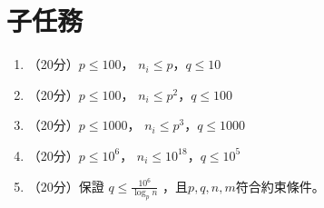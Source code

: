 \documentclass[18pt]{article}
\begin{document}
    \section*{子任務}
    \begin{enumerate}
        \item （20分）$p \le 100$， $n_i \le p$，$q \le 10$
        \item （20分）$p \le 100$， $n_i \le p^2$，$q \le 100$
        \item （20分）$p \le 1000$， $n_i \le p^3$，$q \le 1000$
        \item （20分）$p \le 10^6$， $n_i \le 10^{18}$，$q \le 10^5$
        \item （20分）保證 $q \le \frac{10^6}{\log_{p} n}$ ，且$p,q,n,m$符合約束條件。
    \end{enumerate}
\end{document}
